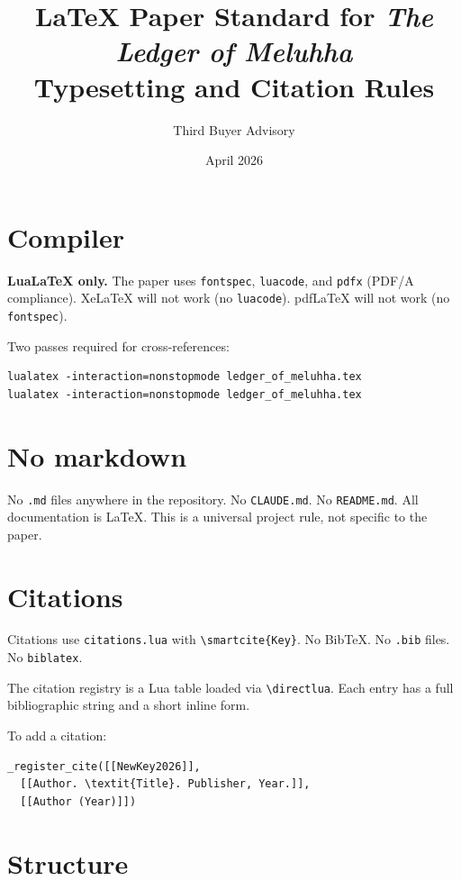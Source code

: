 \documentclass[11pt]{article}
\title{\textbf{LaTeX Paper Standard for \textit{The Ledger of Meluhha}}\\
  \large Typesetting and Citation Rules}
\author{Third Buyer Advisory}
\date{April 2026}
\begin{document}
\maketitle

\section{Compiler}

\textbf{LuaLaTeX only.} The paper uses \texttt{fontspec},
\texttt{luacode}, and \texttt{pdfx} (PDF/A compliance).
XeLaTeX will not work (no \texttt{luacode}).
pdfLaTeX will not work (no \texttt{fontspec}).

Two passes required for cross-references:
\begin{Verbatim}[fontsize=\small,frame=single]
lualatex -interaction=nonstopmode ledger_of_meluhha.tex
lualatex -interaction=nonstopmode ledger_of_meluhha.tex
\end{Verbatim}

\section{No markdown}

No \texttt{.md} files anywhere in the repository.
No \texttt{CLAUDE.md}. No \texttt{README.md}.
All documentation is LaTeX. This is a universal project rule,
not specific to the paper.

\section{Citations}

Citations use \texttt{citations.lua} with
\texttt{\textbackslash smartcite\{Key\}}.
No BibTeX. No \texttt{.bib} files. No \texttt{biblatex}.

The citation registry is a Lua table loaded via
\texttt{\textbackslash directlua}. Each entry has a full
bibliographic string and a short inline form.

To add a citation:
\begin{Verbatim}[fontsize=\small,frame=single]
_register_cite([[NewKey2026]],
  [[Author. \textit{Title}. Publisher, Year.]],
  [[Author (Year)]])
\end{Verbatim}

\section{Structure}
\end{document}
